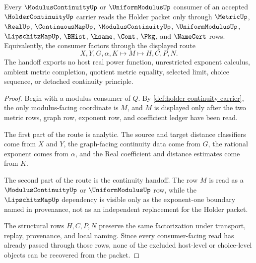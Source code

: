 \begin{theorem}
\label{thm:holder-continuity-modulus-handoff}
Every $\ModulusContinuityUp$ or $\UniformModulusUp$ consumer of an accepted $\HolderContinuityUp$ carrier reads the Holder packet only through $\MetricUp$, $\RealUp$, $\ContinuousMapUp$, $\ModulusContinuityUp$, $\UniformModulusUp$, $\LipschitzMapUp$, $\BHist$, $\hsame$, $\Cont$, $\Pkg$, and $\NameCert$ rows. Equivalently, the consumer factors through the displayed route
$$
X,Y,G,\alpha,K \longmapsto M \longmapsto H,C,P,N .
$$
The handoff exports no host real power function, unrestricted exponent calculus, ambient metric completion, quotient metric equality, selected limit, choice sequence, or detached continuity principle.
\end{theorem}
\begin{proof}
Begin with a modulus consumer of $Q$. By \autoref{def:holder-continuity-carrier}, the only modulus-facing coordinate is $M$, and $M$ is displayed only after the two metric rows, graph row, exponent row, and coefficient ledger have been read.

The first part of the route is analytic. The source and target distance classifiers come from $X$ and $Y$, the graph-facing continuity data come from $G$, the rational exponent comes from $\alpha$, and the Real coefficient and distance estimates come from $K$.

The second part of the route is the continuity handoff. The row $M$ is read as a $\ModulusContinuityUp$ or $\UniformModulusUp$ row, while the $\LipschitzMapUp$ dependency is visible only as the exponent-one boundary named in provenance, not as an independent replacement for the Holder packet.

The structural rows $H,C,P,N$ preserve the same factorization under transport, replay, provenance, and local naming. Since every consumer-facing read has already passed through those rows, none of the excluded host-level or choice-level objects can be recovered from the packet.
\end{proof}


